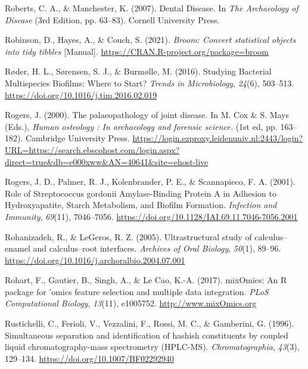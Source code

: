 \documentclass[
  letterpaper,
]{book}
\newlength{\cslhangindent}
\newlength{\cslentryspacingunit} %
\newenvironment{CSLReferences}[2] %
 {%
  \setlength{\parindent}{0pt}
  \ifodd #1
  \let\oldpar\par
  \def\par{\hangindent=\cslhangindent\oldpar}
  \fi
  \setlength{\parskip}{#2\cslentryspacingunit}
 }%
 {}
\begin{document}
\begin{CSLReferences}{1}{0}
\leavevmode{}%
Roberts, C. A., \& Manchester, K. (2007). Dental {Disease}. In \emph{The
{Archaeology} of {Disease}} (3rd Edition, pp. 63--83). {Cornell
University Press}.

\leavevmode{}%
Robinson, D., Hayes, A., \& Couch, S. (2021). \emph{Broom: {Convert}
statistical objects into tidy tibbles} {[}Manual{]}.
\url{https://CRAN.R-project.org/package=broom}

\leavevmode{}%
Røder, H. L., Sørensen, S. J., \& Burmølle, M. (2016). Studying
{Bacterial Multispecies Biofilms}: {Where} to {Start}? \emph{Trends in
Microbiology}, \emph{24}(6), 503--513.
\url{https://doi.org/10.1016/j.tim.2016.02.019}

\leavevmode{}%
Rogers, J. (2000). The palaeopathology of joint disease. In M. Cox \& S.
Mays (Eds.), \emph{Human osteology : {In} archaeology and forensic
science.} (1st ed, pp. 163--182). {Cambridge University Press}.
\url{https://login.ezproxy.leidenuniv.nl:2443/login?URL=https://search.ebscohost.com/login.aspx?direct=true\&db=e000xww\&AN=40641\&site=ehost-live}

\leavevmode{}%
Rogers, J. D., Palmer, R. J., Kolenbrander, P. E., \& Scannapieco, F. A.
(2001). Role of {Streptococcus} gordonii {Amylase-Binding Protein A} in
{Adhesion} to {Hydroxyapatite}, {Starch Metabolism}, and {Biofilm
Formation}. \emph{Infection and Immunity}, \emph{69}(11), 7046--7056.
\url{https://doi.org/10.1128/IAI.69.11.7046-7056.2001}

\leavevmode{}%
Rohanizadeh, R., \& LeGeros, R. Z. (2005). Ultrastructural study of
calculus--enamel and calculus--root interfaces. \emph{Archives of Oral
Biology}, \emph{50}(1), 89--96.
\url{https://doi.org/10.1016/j.archoralbio.2004.07.001}

\leavevmode{}%
Rohart, F., Gautier, B., Singh, A., \& Le Cao, K.-A. (2017). {mixOmics}:
{An R} package for 'omics feature selection and multiple data
integration. \emph{PLoS Computational Biology}, \emph{13}(11), e1005752.
\url{http://www.mixOmics.org}

\leavevmode{}%
Rustichelli, C., Ferioli, V., Vezzalini, F., Rossi, M. C., \& Gamberini,
G. (1996). Simultaneous separation and identification of hashish
constituents by coupled liquid chromatography-mass spectrometry
({HPLC-MS}). \emph{Chromatographia}, \emph{43}(3), 129--134.
\url{https://doi.org/10.1007/BF02292940}


\end{CSLReferences}
\end{document}
